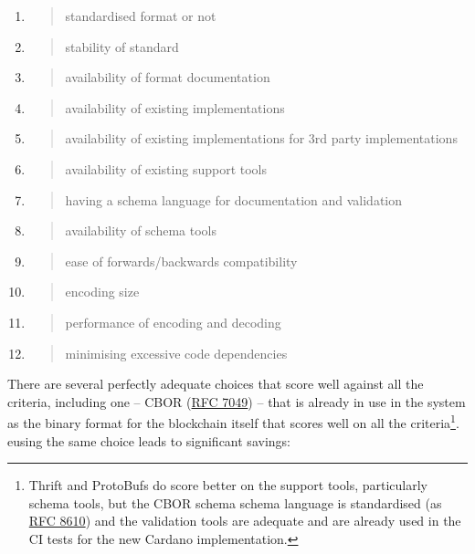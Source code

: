 \documentclass[]{article}
\begin{document}
\begin{enumerate}
\def\labelenumi{\arabic{enumi}.}
\item
  \begin{quote}
  standardised format or not
  \end{quote}
\item
  \begin{quote}
  stability of standard
  \end{quote}
\item
  \begin{quote}
  availability of format documentation
  \end{quote}
\item
  \begin{quote}
  availability of existing implementations
  \end{quote}
\item
  \begin{quote}
  availability of existing implementations for 3rd party implementations
  \end{quote}
\item
  \begin{quote}
  availability of existing support tools
  \end{quote}
\item
  \begin{quote}
  having a schema language for documentation and validation
  \end{quote}
\item
  \begin{quote}
  availability of schema tools
  \end{quote}
\item
  \begin{quote}
  ease of forwards/backwards compatibility
  \end{quote}
\item
  \begin{quote}
  encoding size
  \end{quote}
\item
  \begin{quote}
  performance of encoding and decoding
  \end{quote}
\item
  \begin{quote}
  minimising excessive code dependencies
  \end{quote}
\end{enumerate}

There are several perfectly adequate choices that score well against all
the criteria, including one -- CBOR
(\href{https://tools.ietf.org/html/rfc7049}{{RFC 7049}}) -- that is
already in use in the system as the binary format for the blockchain
itself that scores well on all the criteria\footnote{Thrift and
  ProtoBufs do score better on the support tools, particularly schema
  tools, but the CBOR schema schema language is standardised (as
  \href{https://tools.ietf.org/html/rfc8610}{{RFC 8610}}) and the
  validation tools are adequate and are already used in the CI tests for
  the new Cardano implementation.}. eusing the same choice leads to
significant savings:
\end{document}
